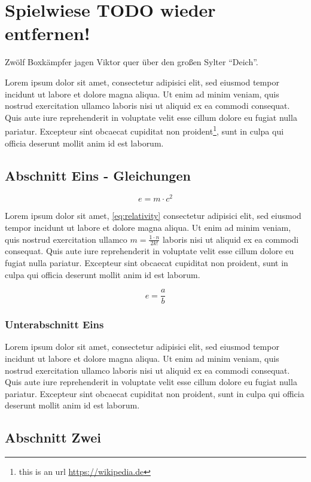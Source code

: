 \chapter{Spielwiese TODO wieder entfernen!} \label{spielwiese}

Zwölf Boxkämpfer jagen Viktor quer über den großen Sylter ``Deich''.

Lorem  ipsum dolor sit amet, consectetur adipisici elit, sed eiusmod tempor incidunt ut labore et dolore magna aliqua. Ut enim ad minim veniam, quis nostrud exercitation ullamco laboris nisi ut aliquid ex ea commodi consequat. Quis aute iure reprehenderit in voluptate velit esse cillum dolore eu fugiat nulla pariatur. Excepteur sint obcaecat cupiditat non proident\footnote{this is an url \url{https://wikipedia.de}}, sunt in culpa qui officia deserunt mollit anim id est laborum. 

\section{Abschnitt Eins - Gleichungen}

\begin{equation} \label{eq:relativity}
e = m \cdot c^{2}
\end{equation}

Lorem ipsum dolor sit amet, \autoref{eq:relativity} consectetur adipisici elit, sed eiusmod tempor incidunt ut labore et dolore magna aliqua. Ut enim ad minim veniam, quis nostrud exercitation ullamco $m=\frac{1 \cdot n}{2k!}$ laboris nisi ut aliquid ex ea commodi consequat. Quis aute iure reprehenderit in voluptate velit esse cillum dolore eu fugiat nulla pariatur. Excepteur sint obcaecat cupiditat non proident, sunt in culpa qui officia deserunt mollit anim id est laborum.

$$ e=\frac{a}{b}$$

\subsection{Unterabschnitt Eins}
Lorem ipsum dolor sit amet, consectetur adipisici elit, sed eiusmod tempor incidunt ut labore et dolore magna aliqua. Ut enim ad minim veniam, quis nostrud exercitation ullamco laboris nisi ut aliquid ex ea commodi consequat. Quis aute iure reprehenderit in voluptate velit esse cillum dolore eu fugiat nulla pariatur. Excepteur sint obcaecat cupiditat non proident, sunt in culpa qui officia deserunt mollit anim id est laborum.

\section{Abschnitt Zwei}

